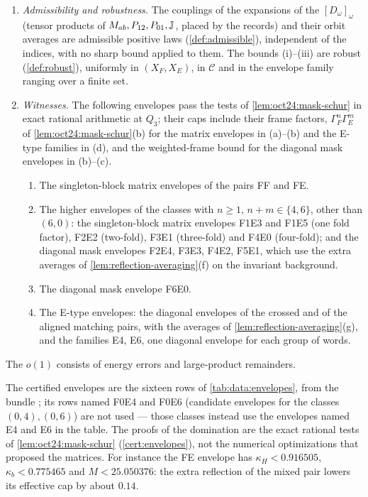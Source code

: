 \begin{theorem}
\begin{enumerate}[label=(\roman*)]
 not an upper bound for one, and $M^{\rm inv}$ and $\delta_{\rm s}$, which enter with a minus
 sign, are a lower bound and the saving computed from the same tag prices as
 $R_{\rm err}$.
\item \emph{Admissibility and robustness.} The couplings of the expansions of the
 $[D_\omega]_\omega$ (tensor products of $M_{ab},P_{12},P_{01},\mathbb J$, placed by the
 records) and their orbit averages are admissible positive laws
 (\cref{def:admissible}), independent of the indices, with no sharp bound applied to
 them. The bounds (i)--(iii) are robust (\cref{def:robust}), uniformly in
 $(X_F,X_E)$, in $\mathcal C$ and in the envelope family ranging over a finite set.
\item \emph{Witnesses.} The following envelopes pass the tests of
 \cref{lem:oct24:mask-schur} in exact rational arithmetic at $Q_3$; their caps include
 their frame factors, $\Gamma_F^n\Gamma_E^m$ of \cref{lem:oct24:mask-schur}(b) for the matrix envelopes in (a)--(b) and the E-type families in (d), and the weighted-frame bound for the diagonal mask envelopes in (b)--(c).
 \begin{enumerate}[label=(\alph*)]
 \item The singleton-block matrix envelopes of the pairs FF and FE.
 \item The higher envelopes of the classes with $n\ge1$, $n+m\in\{4,6\}$, other than
  $(6,0)$: the singleton-block matrix envelopes F1E3 and F1E5 (one fold factor),
  F2E2 (two-fold), F3E1 (three-fold) and F4E0 (four-fold); and the diagonal mask
  envelopes F2E4, F3E3, F4E2, F5E1, which use the extra averages of
  \cref{lem:reflection-averaging}(f) on the invariant background.
 \item The diagonal mask envelope F6E0.
 \item The E-type envelopes: the diagonal envelopes of the crossed and of the
  aligned matching pairs, with the averages of \cref{lem:reflection-averaging}(g),
  and the families E4, E6, one diagonal envelope for each group of words.
 \end{enumerate}
\end{enumerate}
The $o(1)$ consists of energy errors and large-product remainders.
\end{theorem}

The certified envelopes are the sixteen rows of \cref{tab:data:envelopes}, from the
bundle ;
its rows named F0E4 and F0E6 (candidate envelopes for the classes
$(0,4),(0,6)$) are not used --- those classes
instead use the envelopes named E4 and E6 in the table. The proofs of the domination are the exact rational
tests of \cref{lem:oct24:mask-schur} (\cref{cert:envelopes}), not the numerical
optimizations that proposed the matrices. For instance the FE envelope has
$\kappa_H<0.916505$, $\kappa_b<0.775465$ and $M<25.050376$: the extra reflection of the
mixed pair lowers its effective cap by about $0.14$.

